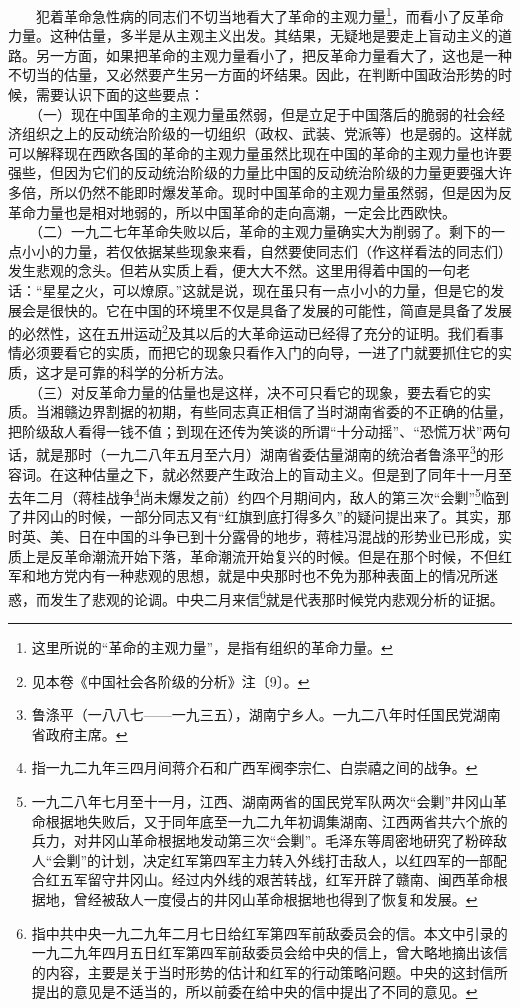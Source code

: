 \documentclass[cn,11pt,chinese]{elegantbook}
\begin{document}
　　犯着革命急性病的同志们不切当地看大了革命的主观力量\footnote[3]{ 这里所说的“革命的主观力量”，是指有组织的革命力量。}，而看小了反革命力量。这种估量，多半是从主观主义出发。其结果，无疑地是要走上盲动主义的道路。另一方面，如果把革命的主观力量看小了，把反革命力量看大了，这也是一种不切当的估量，又必然要产生另一方面的坏结果。因此，在判断中国政治形势的时候，需要认识下面的这些要点：\\
　　（一）现在中国革命的主观力量虽然弱，但是立足于中国落后的脆弱的社会经济组织之上的反动统治阶级的一切组织（政权、武装、党派等）也是弱的。这样就可以解释现在西欧各国的革命的主观力量虽然比现在中国的革命的主观力量也许要强些，但因为它们的反动统治阶级的力量比中国的反动统治阶级的力量更要强大许多倍，所以仍然不能即时爆发革命。现时中国革命的主观力量虽然弱，但是因为反革命力量也是相对地弱的，所以中国革命的走向高潮，一定会比西欧快。\\
　　（二）一九二七年革命失败以后，革命的主观力量确实大为削弱了。剩下的一点小小的力量，若仅依据某些现象来看，自然要使同志们（作这样看法的同志们）发生悲观的念头。但若从实质上看，便大大不然。这里用得着中国的一句老话：“星星之火，可以燎原。”这就是说，现在虽只有一点小小的力量，但是它的发展会是很快的。它在中国的环境里不仅是具备了发展的可能性，简直是具备了发展的必然性，这在五卅运动\footnote[4]{ 见本卷《中国社会各阶级的分析》注〔9〕。}及其以后的大革命运动已经得了充分的证明。我们看事情必须要看它的实质，而把它的现象只看作入门的向导，一进了门就要抓住它的实质，这才是可靠的科学的分析方法。\\
　　（三）对反革命力量的估量也是这样，决不可只看它的现象，要去看它的实质。当湘赣边界割据的初期，有些同志真正相信了当时湖南省委的不正确的估量，把阶级敌人看得一钱不值；到现在还传为笑谈的所谓“十分动摇”、“恐慌万状”两句话，就是那时（一九二八年五月至六月）湖南省委估量湖南的统治者鲁涤平\footnote[5]{ 鲁涤平（一八八七——一九三五），湖南宁乡人。一九二八年时任国民党湖南省政府主席。}的形容词。在这种估量之下，就必然要产生政治上的盲动主义。但是到了同年十一月至去年二月（蒋桂战争\footnote[6]{ 指一九二九年三四月间蒋介石和广西军阀李宗仁、白崇禧之间的战争。}尚未爆发之前）约四个月期间内，敌人的第三次“会剿”\footnote[7]{ 一九二八年七月至十一月，江西、湖南两省的国民党军队两次“会剿”井冈山革命根据地失败后，又于同年底至一九二九年初调集湖南、江西两省共六个旅的兵力，对井冈山革命根据地发动第三次“会剿”。毛泽东等周密地研究了粉碎敌人“会剿”的计划，决定红军第四军主力转入外线打击敌人，以红四军的一部配合红五军留守井冈山。经过内外线的艰苦转战，红军开辟了赣南、闽西革命根据地，曾经被敌人一度侵占的井冈山革命根据地也得到了恢复和发展。}临到了井冈山的时候，一部分同志又有“红旗到底打得多久”的疑问提出来了。其实，那时英、美、日在中国的斗争已到十分露骨的地步，蒋桂冯混战的形势业已形成，实质上是反革命潮流开始下落，革命潮流开始复兴的时候。但是在那个时候，不但红军和地方党内有一种悲观的思想，就是中央那时也不免为那种表面上的情况所迷惑，而发生了悲观的论调。中央二月来信\footnote[8]{ 指中共中央一九二九年二月七日给红军第四军前敌委员会的信。本文中引录的一九二九年四月五日红军第四军前敌委员会给中央的信上，曾大略地摘出该信的内容，主要是关于当时形势的估计和红军的行动策略问题。中央的这封信所提出的意见是不适当的，所以前委在给中央的信中提出了不同的意见。}就是代表那时候党内悲观分析的证据。\\
\end{document}
